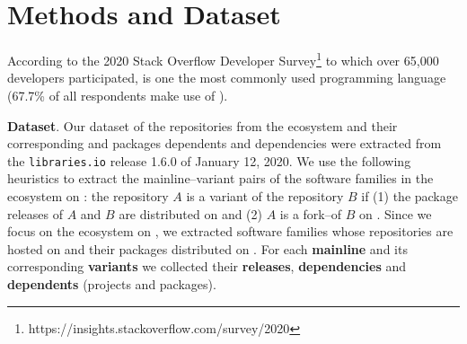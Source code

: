 \section{Methods and Dataset}
\label{sec:method}
According to the 2020 Stack Overflow Developer Survey\footnote{https://insights.stackoverflow.com/survey/2020} to which over 65,000 developers participated, \js is one the most commonly used programming language (67.7\% of all respondents make use of \js).



\textbf{Dataset}. Our dataset of the \gh repositories from the \js ecosystem and their corresponding and \np packages dependents and dependencies were extracted from the \texttt{libraries.io} release 1.6.0 of January 12, 2020. We use the following heuristics to extract the mainline--variant pairs of the software families in the \js ecosystem on \gh: the repository $A$ is a variant of the repository $B$ if (1) the package releases of $A$ and $B$ are distributed on \npm 
and (2) $A$ is a fork--of $B$ on \gh.
Since we focus on the \js ecosystem on \gh, we extracted software families whose repositories are hosted on \gh and their packages distributed on \npm.
For each \textbf{mainline} and its corresponding \textbf{variants} we collected their \textbf{releases}, \textbf{dependencies} and \textbf{dependents} (projects and packages).






